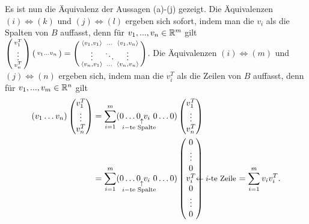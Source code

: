 \documentclass[../../main.tex]{subfiles}
\begin{document}
\begin{cproof}
\noindent Es ist nun die Äquivalenz der Aussagen (a)-(j) gezeigt. Die Äquivalenzen \underline{$(i)\Longleftrightarrow (k)$} und \underline{$(j)\Longleftrightarrow (l)$} ergeben sich sofort, indem man die $v_i$ als die Spalten von $B$ auffasst, denn für $v_1,...,v_n\in \mathbb R^m$ gilt $\left(\begin{smallmatrix}v_1^T\\\vdots\\ v_n^T\end{smallmatrix}\right)\left(\begin{smallmatrix}v_1\hdots v_n\end{smallmatrix}\right)=\left(\begin{smallmatrix}\langle v_1,v_1\rangle&\hdots&\langle v_1,v_n\rangle\\\vdots &\ddots&\vdots\\ \langle v_n,v_1\rangle&\hdots&\langle v_n,v_n\rangle\end{smallmatrix}\right)$. Die Äquivalenzen \underline{$(i)\Longleftrightarrow (m)$} und \underline{$(j)\Longleftrightarrow (n)$} ergeben sich, indem man die $v^T_i$ als die Zeilen von $B$ auffasst, denn für $v_1,...,v_m\in \mathbb R^n$ gilt
\begin{align*}
(v_1\hdots v_n)\begin{pmatrix}v_1^T\\\vdots\\ v_n^T\end{pmatrix}&=\sum_{i=1}^m(0\hdots 0\ v_i\ 0\blap{\llap{$\begin{smallmatrix}\ \ \uparrow\\i-\text{te Spalte}\end{smallmatrix}$}}\hdots 0)\begin{pmatrix}v_1^T\\\vdots\\ v_n^T\end{pmatrix}\\
&=\sum_{i=1}^m(0\hdots 0\ v_i\ 0\blap{\llap{$\begin{smallmatrix}\ \ \uparrow\\i-\text{te Spalte}\end{smallmatrix}$}}\hdots 0)\begin{pmatrix}0\\\vdots\\0\\v_i^T\rlap{\small$\leftarrow i$-te Zeile}\\0\\\vdots\\0\end{pmatrix}\qquad\qquad=\sum_{i=1}^m v_iv_i^T.
\end{align*}
\end{cproof}
\end{document}
